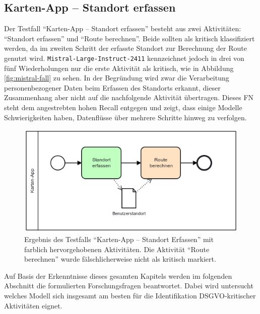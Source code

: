 \subsection*{Karten-App – Standort erfassen}

Der Testfall \enquote{Karten-App – Standort erfassen} besteht aus zwei Aktivitäten: \enquote{Standort erfassen} und \enquote{Route berechnen}. Beide sollten als kritisch klassifiziert werden, da im zweiten Schritt der erfasste Standort zur Berechnung der Route genutzt wird. \texttt{Mistral-Large-Instruct-2411} kennzeichnet jedoch in drei von fünf Wiederholungen nur die erste Aktivität als kritisch, wie in Abbildung \autoref{fig:mistral-fall} zu sehen. In der Begründung wird zwar die Verarbeitung personenbezogener Daten beim Erfassen des Standorts erkannt, dieser Zusammenhang aber nicht auf die nachfolgende Aktivität übertragen. Dieses \ac{FN} steht dem angestrebten hohen Recall entgegen und zeigt, dass einige Modelle Schwierigkeiten haben, Datenflüsse über mehrere Schritte hinweg zu verfolgen.

\begin{figure}
    \centering
    \includegraphics[width=.55\textwidth]{images/results/examples/mistral-large-run-3-small-maps-app}
    \caption{Ergebnis des Testfalls \enquote{Karten-App – Standort Erfassen} mit farblich hervorgehobenen Aktivitäten. Die Aktivität \enquote{Route berechnen} wurde fälschlicherweise nicht als kritisch markiert.}
    \label{fig:mistral-fall}
\end{figure}

Auf Basis der Erkenntnisse dieses gesamten Kapitels werden im folgenden Abschnitt die formulierten Forschungsfragen beantwortet. Dabei wird untersucht welches Modell sich insgesamt am besten für die Identifikation \ac{DSGVO}‑kritischer Aktivitäten eignet.